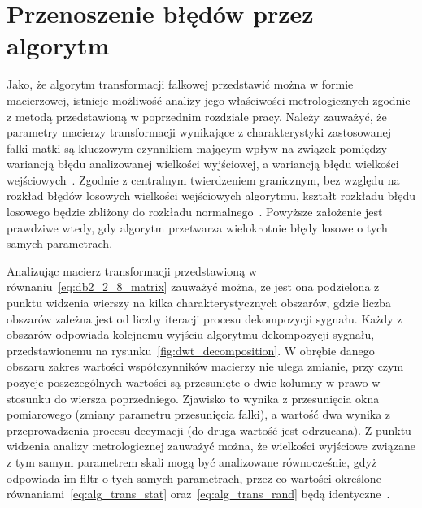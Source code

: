 \section{Przenoszenie błędów przez algorytm}

Jako, że algorytm transformacji falkowej przedstawić można w formie macierzowej, istnieje możliwość analizy jego właściwości metrologicznych zgodnie z metodą przedstawioną w poprzednim rozdziale pracy. Należy zauważyć, że parametry macierzy transformacji wynikające z charakterystyki zastosowanej falki-matki są kluczowym czynnikiem mającym wpływ na związek pomiędzy wariancją błędu analizowanej wielkości wyjściowej, a wariancją błędu wielkości wejściowych~\cite{auth_electronics}. Zgodnie z centralnym twierdzeniem granicznym, bez względu na rozkład błędów losowych wielkości wejściowych algorytmu, kształt rozkładu błędu losowego będzie zbliżony do rozkładu normalnego~\cite{jcgm_guide}. Powyższe założenie jest prawdziwe wtedy, gdy algorytm przetwarza wielokrotnie błędy losowe o tych samych parametrach.

Analizując macierz transformacji przedstawioną w równaniu~\eqref{eq:db2_2_8_matrix} zauważyć można, że jest ona podzielona z punktu widzenia wierszy na kilka charakterystycznych obszarów, gdzie liczba obszarów zależna jest od liczby iteracji procesu dekompozycji sygnału. Każdy z obszarów odpowiada kolejnemu wyjściu algorytmu dekompozycji sygnału, przedstawionemu na rysunku~\ref{fig:dwt_decomposition}. W obrębie danego obszaru zakres wartości współczynników macierzy nie ulega zmianie, przy czym pozycje poszczególnych wartości są przesunięte o dwie kolumny w prawo w stosunku do wiersza poprzedniego. Zjawisko to wynika z przesunięcia okna pomiarowego (zmiany parametru przesunięcia falki), a wartość dwa wynika z przeprowadzenia procesu decymacji (do druga wartość jest odrzucana). Z punktu widzenia analizy metrologicznej zauważyć można, że wielkości wyjściowe związane z tym samym parametrem skali mogą być analizowane równocześnie, gdyż odpowiada im filtr o tych samych parametrach, przez co wartości określone równaniami~\eqref{eq:alg_trans_stat} oraz~\eqref{eq:alg_trans_rand} będą identyczne~\cite{auth_electronics}.

